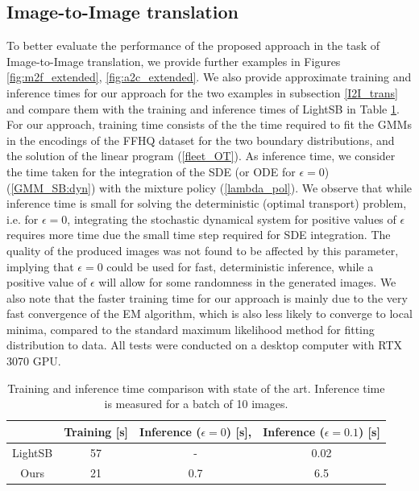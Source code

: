 \documentclass[twoside]{article}
\renewcommand{\eqref}[1]{(\ref{#1})}
\begin{document}
\subsection{Image-to-Image translation} \label{expDetails_Im}
%
To better evaluate the performance of the proposed approach in the task of Image-to-Image translation, we provide further examples in Figures \ref{fig:m2f_extended}, \ref{fig:a2c_extended}. 
We also provide approximate training and inference times for our approach for the two examples in subsection \ref{I2I_trans} and compare them with the training and inference times of LightSB in Table \ref{tab:speed}.
For our approach, training time consists of the the time required to fit the GMMs in the encodings of the FFHQ dataset for the two boundary distributions, and the solution of the linear program \eqref{fleet_OT}. 
As inference time, we consider the time taken for the integration of the SDE (or ODE for $\epsilon=0$) \eqref{GMM_SB:dyn} with the mixture policy \eqref{lambda_pol}.
We observe that while inference time is small for solving the deterministic (optimal transport) problem, i.e. for $\epsilon=0$, integrating the stochastic dynamical system for positive values of $\epsilon$ requires more time due the small time step required for SDE integration.
%
The quality of the produced images was not found to be affected by this parameter, implying that $\epsilon=0$ could be used for fast, deterministic inference, while a positive value of $\epsilon$ will allow for some randomness in the generated images.  
We also note that the faster training time for our approach is mainly due to the very fast convergence of the EM algorithm, which is also less likely to converge to local minima, compared to the standard maximum likelihood method for fitting distribution to data. 
All tests were conducted on a desktop computer with RTX 3070 GPU. 
\begin{table} [!ht]
    \centering
    \begin{tabular}{|c|c|c|c|}
    \hline
                 & Training [s]  &  Inference ($\epsilon=0$) [s], & Inference ($\epsilon=0.1$) [s]\\
    \hline
         LightSB\tablefootnote{\cite{korotin2024light}} & 57 &  -  & 0.02\\
    \hline
         Ours    & 21 & 0.7 & 6.5\\
    \hline
    \end{tabular}
    \caption{Training and inference time comparison with state of the art. Inference time is measured for a batch of 10 images.}
    \label{tab:speed}
\end{table}
%
\end{document}
